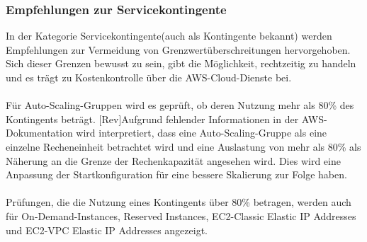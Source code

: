 \subsubsection*{Empfehlungen zur Servicekontingente}
In der Kategorie Servicekontingente(auch als Kontingente bekannt) werden Empfehlungen zur Vermeidung von Grenzwertüberschreitungen hervorgehoben. Sich dieser Grenzen bewusst zu sein, gibt die Möglichkeit, rechtzeitig zu handeln und es trägt zu Kostenkontrolle über die AWS-Cloud-Dienste bei.
\\\\
Für Auto-Scaling-Gruppen %
wird es geprüft, ob deren Nutzung mehr als 80\% des Kontingents beträgt. [Rev]Aufgrund fehlender Informationen in der AWS-Dokumentation wird interpretiert, dass eine Auto-Scaling-Gruppe als eine einzelne Recheneinheit betrachtet wird und eine Auslastung von mehr als 80\% als Näherung an die Grenze der Rechenkapazität angesehen wird.
Dies wird eine Anpassung der Startkonfiguration für eine bessere Skalierung zur Folge haben.
\\\\
Prüfungen, die die Nutzung eines Kontingents über 80\% betragen, werden auch für On-Demand-Instances, Reserved Instances, EC2-Classic Elastic IP Addresses und EC2-VPC Elastic IP Addresses angezeigt.

